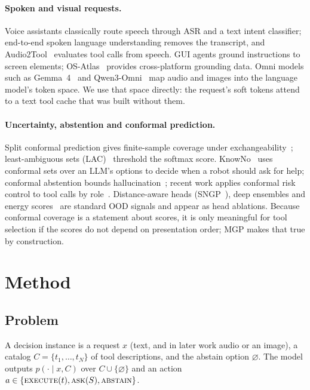 \documentclass[sigconf,review,anonymous]{acmart}
\newcommand{\method}{MGP}
\begin{document}
\paragraph{Spoken and visual requests.}
Voice assistants classically route speech through ASR and a text intent classifier; end-to-end spoken language understanding removes the transcript, and Audio2Tool~\cite{audio2tool} evaluates tool calls from speech.
GUI agents ground instructions to screen elements; OS-Atlas~\cite{wu2024osatlas} provides cross-platform grounding data.
Omni models such as Gemma~4~\cite{gemma4} and Qwen3-Omni~\cite{qwen3omni} map audio and images into the language model's token space.
We use that space directly: the request's soft tokens attend to a text tool cache that was built without them.

\paragraph{Uncertainty, abstention and conformal prediction.}
Split conformal prediction gives finite-sample coverage under exchangeability~\cite{angelopoulos2023gentle}; least-ambiguous sets (LAC)~\cite{sadinle2019lac} threshold the softmax score.
KnowNo~\cite{ren2023knowno} uses conformal sets over an LLM's options to decide when a robot should ask for help; conformal abstention bounds hallucination~\cite{abbasi2024conformal}; recent work applies conformal risk control to tool calls by role~\cite{rolestratified2026}.
Distance-aware heads (SNGP~\cite{liu2020sngp}), deep ensembles and energy scores~\cite{liu2020energy} are standard OOD signals and appear as head ablations.
Because conformal coverage is a statement about scores, it is only meaningful for tool selection if the scores do not depend on presentation order; \method{} makes that true by construction.

\section{Method}\label{sec:method}
\subsection{Problem}
A decision instance is a request $x$ (text, and in later work audio or an image), a catalog $C=\{t_1,\dots,t_N\}$ of tool descriptions, and the abstain option $\varnothing$.
The model outputs $p(\cdot\mid x,C)$ over $C\cup\{\varnothing\}$ and an action $a\in\{\textsc{execute}(t),\textsc{ask}(S),\textsc{abstain}\}$.
\end{document}
